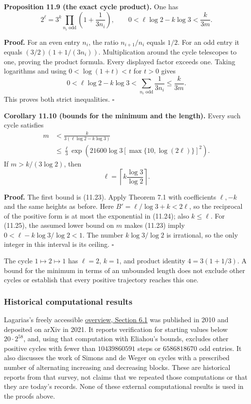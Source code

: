 \documentclass[
  11pt,
  a4paper,
]{article}
\begin{document}
\textbf{Proposition 11.9 (the exact cycle product).} One has \[
2^\ell=3^k\prod_{n_i\text{ odd}}
\left(1+\frac1{3n_i}\right),\qquad
0<\ell\log2-k\log3<\frac{k}{3m}.
\tag{11.23}
\]

\textbf{Proof.} For an even entry \(n_i\), the ratio \(n_{i+1}/n_i\)
equals \(1/2\). For an odd entry it equals \((3/2)(1+1/(3n_i))\).
Multiplication around the cycle telescopes to one, proving the product
formula. Every displayed factor exceeds one. Taking logarithms and using
\(0<\log(1+t)<t\) for \(t>0\) gives \[
0<\ell\log2-k\log3
<\sum_{n_i\text{ odd}}\frac1{3n_i}\le\frac{k}{3m}.
\] This proves both strict inequalities. \(\square\)

\textbf{Corollary 11.10 (bounds for the minimum and the length).} Every
such cycle satisfies \[
\begin{aligned}
m&<\frac{k}{3(\ell\log2-k\log3)}\\
 &\le\frac{\ell}{3}
\exp\!\left(21600\log3[\max\{10,\log(2\ell)\}]^2\right).
\end{aligned}
\tag{11.24}
\] If \(m>k/(3\log2)\), then \[
\ell=\left\lceil k\frac{\log3}{\log2}\right\rceil.
\tag{11.25}
\]

\textbf{Proof.} The first bound is (11.23). Apply Theorem 7.1 with
coefficients \(\ell,-k\) and the same heights as before. Here
\(B'=\ell/\log3+k<2\ell\), so the reciprocal of the positive form is at
most the exponential in (11.24); also \(k\le\ell\). For (11.25), the
assumed lower bound on \(m\) makes (11.23) imply
\(0<\ell-k\log3/\log2<1\). The number \(k\log3/\log2\) is irrational, so
the only integer in this interval is its ceiling. \(\square\)

The cycle \(1\mapsto2\mapsto1\) has \(\ell=2\), \(k=1\), and product
identity \(4=3(1+1/3)\). A bound for the minimum in terms of an
unbounded length does not exclude other cycles or establish that every
positive trajectory reaches this one.

\subsubsection{Historical computational
results}\label{historical-computational-results}

Lagarias's freely accessible
\href{https://arxiv.org/html/2111.02635\#S6.SS1}{overview, Section 6.1}
was published in 2010 and deposited on arXiv in 2021. It reports
verification for starting values below \(20\cdot2^{58}\), and, using
that computation with Eliahou's bounds, excludes other positive cycles
with fewer than \(10439860591\) steps or \(6586818670\) odd entries. It
also discusses the work of Simons and de Weger on cycles with a
prescribed number of alternating increasing and decreasing blocks. These
are historical reports from that survey, not claims that we repeated
those computations or that they are today's records. None of these
external computational results is used in the proofs above.
\end{document}
